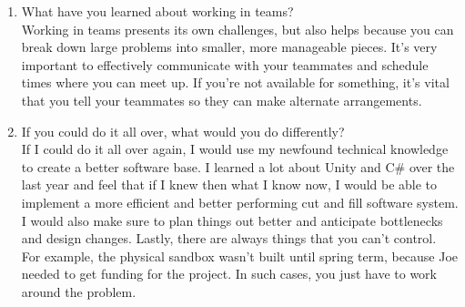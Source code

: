 \documentclass[onecolumn, draftclsnofoot,10pt, compsoc]{IEEEtran}
\begin{document}
\begin{enumerate}
\item What have you learned about working in teams?\\
Working in teams presents its own challenges, but also helps because you can break down large problems into smaller, more manageable pieces. It's very important to effectively communicate with your teammates and schedule times where you can meet up. If you're not available for something, it's vital that you tell your teammates so they can make alternate arrangements.
\item If you could do it all over, what would you do differently?\\
If I could do it all over again, I would use my newfound technical knowledge to create a better software base. I learned a lot about Unity and C\# over the last year and feel that if I knew then what I know now, I would be able to implement a more efficient and better performing cut and fill software system. I would also make sure to plan things out better and anticipate bottlenecks and design changes. Lastly, there are always things that you can't control. For example, the physical sandbox wasn't built until spring term, because Joe needed to get funding for the project. In such cases, you just have to work around the problem.

\end{enumerate}
\end{document}
